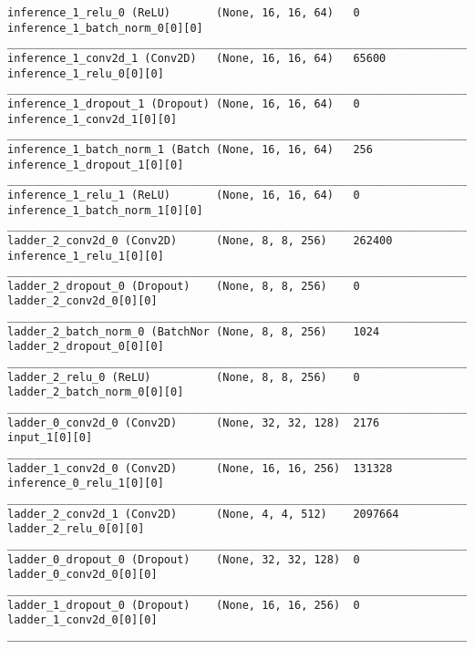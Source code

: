 \begin{lstlisting}[caption={dSprites-VLAE Encoder},captionpos=b,basicstyle=\tiny, label={lst:dsprites-vlae-encoder}]
inference_1_relu_0 (ReLU)       (None, 16, 16, 64)   0           inference_1_batch_norm_0[0][0]
__________________________________________________________________________________________________
inference_1_conv2d_1 (Conv2D)   (None, 16, 16, 64)   65600       inference_1_relu_0[0][0]
__________________________________________________________________________________________________
inference_1_dropout_1 (Dropout) (None, 16, 16, 64)   0           inference_1_conv2d_1[0][0]
__________________________________________________________________________________________________
inference_1_batch_norm_1 (Batch (None, 16, 16, 64)   256         inference_1_dropout_1[0][0]
__________________________________________________________________________________________________
inference_1_relu_1 (ReLU)       (None, 16, 16, 64)   0           inference_1_batch_norm_1[0][0]
__________________________________________________________________________________________________
ladder_2_conv2d_0 (Conv2D)      (None, 8, 8, 256)    262400      inference_1_relu_1[0][0]
__________________________________________________________________________________________________
ladder_2_dropout_0 (Dropout)    (None, 8, 8, 256)    0           ladder_2_conv2d_0[0][0]
__________________________________________________________________________________________________
ladder_2_batch_norm_0 (BatchNor (None, 8, 8, 256)    1024        ladder_2_dropout_0[0][0]
__________________________________________________________________________________________________
ladder_2_relu_0 (ReLU)          (None, 8, 8, 256)    0           ladder_2_batch_norm_0[0][0]
__________________________________________________________________________________________________
ladder_0_conv2d_0 (Conv2D)      (None, 32, 32, 128)  2176        input_1[0][0]
__________________________________________________________________________________________________
ladder_1_conv2d_0 (Conv2D)      (None, 16, 16, 256)  131328      inference_0_relu_1[0][0]
__________________________________________________________________________________________________
ladder_2_conv2d_1 (Conv2D)      (None, 4, 4, 512)    2097664     ladder_2_relu_0[0][0]
__________________________________________________________________________________________________
ladder_0_dropout_0 (Dropout)    (None, 32, 32, 128)  0           ladder_0_conv2d_0[0][0]
__________________________________________________________________________________________________
ladder_1_dropout_0 (Dropout)    (None, 16, 16, 256)  0           ladder_1_conv2d_0[0][0]
__________________________________________________________________________________________________

\end{lstlisting}
